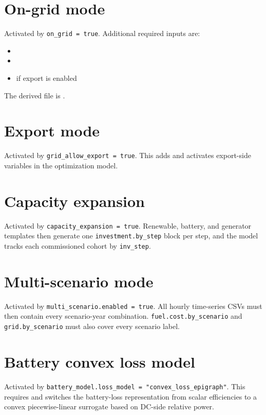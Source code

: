 \documentclass[11pt,a4paper]{report}
\newcommand{\code}[1]{\texttt{#1}}
\begin{document}
\section{On-grid mode}

Activated by \code{on\_grid = true}. Additional required inputs are:

\begin{itemize}[leftmargin=1.5em]
  \item {}
  \item {}
  \item {} if export is enabled
\end{itemize}

The derived file is .

\section{Export mode}

Activated by \code{grid\_allow\_export = true}. This adds  and activates export-side variables in the optimization model.

\section{Capacity expansion}

Activated by \code{capacity\_expansion = true}. Renewable, battery, and generator templates then generate one \code{investment.by\_step} block per step, and the model tracks each commissioned cohort by \code{inv\_step}.

\section{Multi-scenario mode}

Activated by \code{multi\_scenario.enabled = true}. All hourly time-series CSVs must then contain every scenario-year combination. \code{fuel.cost.by\_scenario} and \code{grid.by\_scenario} must also cover every scenario label.

\section{Battery convex loss model}

Activated by \code{battery\_model.loss\_model = "convex\_loss\_epigraph"}. This requires  and switches the battery-loss representation from scalar efficiencies to a convex piecewise-linear surrogate based on DC-side relative power.
\end{document}
